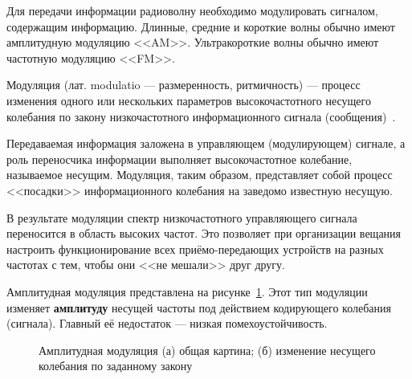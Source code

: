Для передачи информации радиоволну необходимо модулировать сигналом, содержащим информацию. Длинные, средние и короткие волны обычно имеют амплитудную модуляцию <<AM>>. Ультракороткие волны обычно имеют частотную модуляцию <<FM>>.

Модуляция (лат. modulatio --- размеренность, ритмичность) --- процесс изменения одного или нескольких параметров высокочастотного несущего колебания по закону низкочастотного информационного сигнала (сообщения)~\cite{wiki:modulation}.

Передаваемая информация заложена в управляющем (модулирующем) сигнале, а роль переносчика информации выполняет высокочастотное колебание, называемое несущим. Модуляция, таким образом, представляет собой процесс <<посадки>> информационного колебания на заведомо известную несущую.

В результате модуляции спектр низкочастотного управляющего сигнала переносится в область высоких частот. Это позволяет при организации вещания настроить функционирование всех приёмо-передающих устройств на разных частотах с тем, чтобы они <<не мешали>> друг другу.

Амплитудная модуляция представлена на рисунке~\ref{fig:am}. Этот тип модуляции изменяет \textbf{амплитуду} несущей частоты под действием кодирующего колебания (сигнала). Главный её недостаток --- низкая помехоустойчивость.

\begin{figure}[ht]
    \caption{Амплитудная модуляция (а) общая картина; (б) изменение несущего колебания по заданному закону}
    \label{fig:am}
\end{figure}

